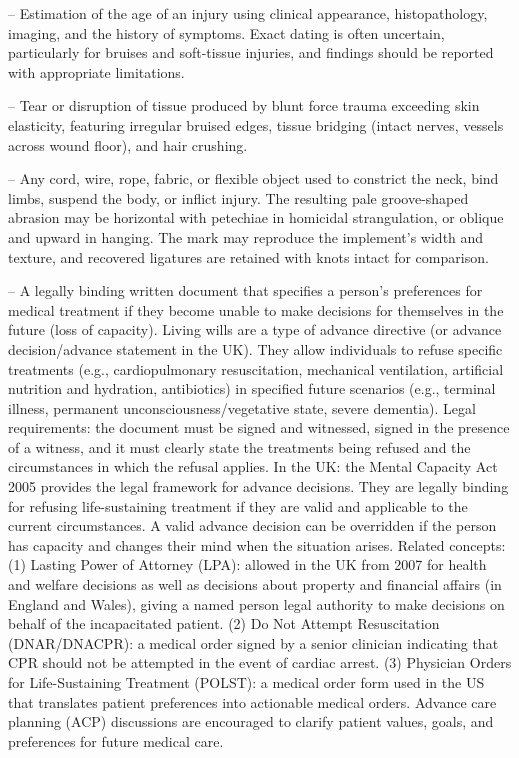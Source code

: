 -- Estimation of the age of an injury using clinical appearance, histopathology, imaging, and the history of symptoms. Exact dating is often uncertain, particularly for bruises and soft-tissue injuries, and findings should be reported with appropriate limitations.

-- Tear or disruption of tissue produced by blunt force trauma exceeding skin elasticity, featuring irregular bruised edges, tissue bridging (intact nerves, vessels across wound floor), and hair crushing.

-- Any cord, wire, rope, fabric, or flexible object used to constrict the neck, bind limbs, suspend the body, or inflict injury. The resulting pale groove-shaped abrasion may be horizontal with petechiae in homicidal strangulation, or oblique and upward in hanging. The mark may reproduce the implement's width and texture, and recovered ligatures are retained with knots intact for comparison.

-- A legally binding written document that specifies a person's preferences for medical treatment if they become unable to make decisions for themselves in the future (loss of capacity). Living wills are a type of advance directive (or advance decision/advance statement in the UK). They allow individuals to refuse specific treatments (e.g., cardiopulmonary resuscitation, mechanical ventilation, artificial nutrition and hydration, antibiotics) in specified future scenarios (e.g., terminal illness, permanent unconsciousness/vegetative state, severe dementia). Legal requirements: the document must be signed and witnessed, signed in the presence of a witness, and it must clearly state the treatments being refused and the circumstances in which the refusal applies. In the UK: the Mental Capacity Act 2005 provides the legal framework for advance decisions. They are legally binding for refusing life-sustaining treatment if they are valid and applicable to the current circumstances. A valid advance decision can be overridden if the person has capacity and changes their mind when the situation arises. Related concepts: (1) Lasting Power of Attorney (LPA): allowed in the UK from 2007 for health and welfare decisions as well as decisions about property and financial affairs (in England and Wales), giving a named person legal authority to make decisions on behalf of the incapacitated patient. (2) Do Not Attempt Resuscitation (DNAR/DNACPR): a medical order signed by a senior clinician indicating that CPR should not be attempted in the event of cardiac arrest. (3) Physician Orders for Life-Sustaining Treatment (POLST): a medical order form used in the US that translates patient preferences into actionable medical orders. Advance care planning (ACP) discussions are encouraged to clarify patient values, goals, and preferences for future medical care.

